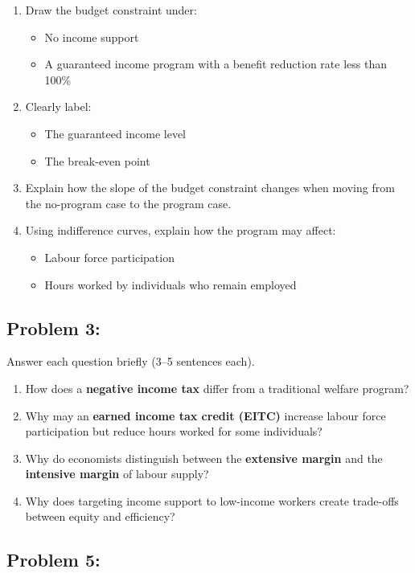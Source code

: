 \documentclass[12pt]{article}
\begin{document}
\begin{enumerate}
\item Draw the budget constraint under:
\begin{itemize}
\item No income support
\item A guaranteed income program with a benefit reduction rate less than 100\%
\end{itemize}
\item Clearly label:
\begin{itemize}
\item The guaranteed income level
\item The break-even point
\end{itemize}
\item Explain how the slope of the budget constraint changes when moving from the no-program case to the program case.
\item Using indifference curves, explain how the program may affect:
\begin{itemize}
\item Labour force participation
\item Hours worked by individuals who remain employed
\end{itemize}
\end{enumerate}

\subsection*{Problem 3: }

Answer each question briefly (3--5 sentences each).

\begin{enumerate}
\item How does a \textbf{negative income tax} differ from a traditional welfare program?
\item Why may an \textbf{earned income tax credit (EITC)} increase labour force participation but reduce hours worked for some individuals?
\item Why do economists distinguish between the \textbf{extensive margin} and the \textbf{intensive margin} of labour supply?
\item Why does targeting income support to low-income workers create trade-offs between equity and efficiency?
\end{enumerate}



\subsection*{Problem 5: }
\end{document}
